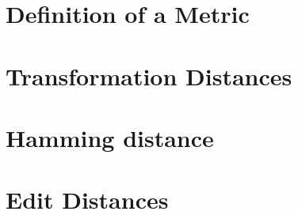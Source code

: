 

\section{Definition of a Metric}

\section{Transformation Distances}

\section{Hamming distance}

\section{Edit Distances}




